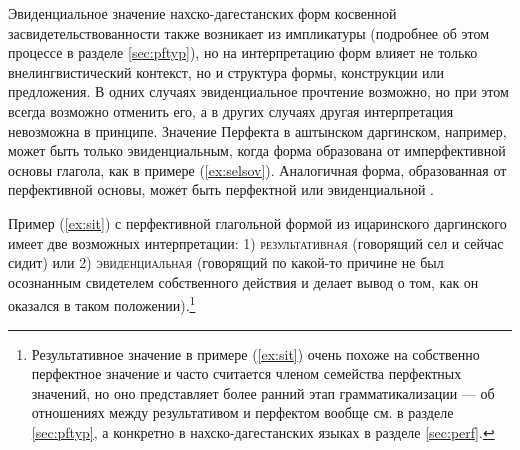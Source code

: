 \par \color{purple} Эвиденциальное значение нахско-дагестанских форм косвенной засвидетельствованности также возникает из импликатуры (подробнее об этом процессе в разделе \ref{sec:pftyp}), но на интерпретацию форм влияет не только внелингвистический контекст, но и структура формы, конструкции или предложения. В одних случаях эвиденциальное прочтение возможно, но при этом всегда возможно отменить его, а в других случаях другая интерпретация невозможна в принципе. \color{black} Значение Перфекта в аштынском даргинском, например, может быть только эвиденциальным, когда форма образована от имперфективной основы глагола, как в примере (\ref{ex:selsov}). Аналогичная форма, образованная от перфективной основы, может быть перфектной или эвиденциальной \citep[202--204]{belyaev2012}.


Пример (\ref{ex:sit}) с перфективной глагольной формой из ицаринского даргинского имеет две возможных интерпретации: 1) \textsc{результативная} (говорящий сел и сейчас сидит) или 2) \textsc{эвиденциальная} (говорящий по какой-то причине не был осознанным свидетелем собственного действия и делает вывод о том, как он оказался в таком положении).\footnote{Результативное значение в примере (\ref{ex:sit}) очень похоже на собственно перфектное значение и часто считается членом семейства перфектных значений, но оно представляет более ранний этап грамматикализации --- об отношениях между результативом и перфектом вообще см. в разделе \ref{sec:pftyp}, а конкретно в нахско-дагестанских языках в разделе \ref{sec:perf}.}


